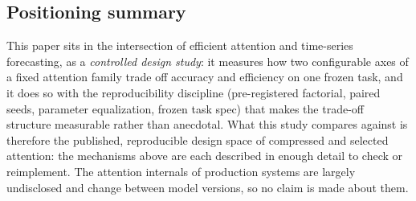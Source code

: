 \subsection{Positioning summary}
This paper sits in the intersection of efficient attention and
time-series forecasting, as a \emph{controlled design study}: it measures
how two configurable axes of a fixed attention family trade off accuracy
and efficiency on one frozen task, and it does so with the reproducibility
discipline (pre-registered factorial, paired seeds, parameter
equalization, frozen task spec) that makes the trade-off structure
measurable rather than anecdotal. What this study compares against is
therefore the published, reproducible design space of compressed and
selected attention: the mechanisms above are each described in enough
detail to check or reimplement. The attention internals of production
systems are largely undisclosed and change between model versions, so no
claim is made about them.
